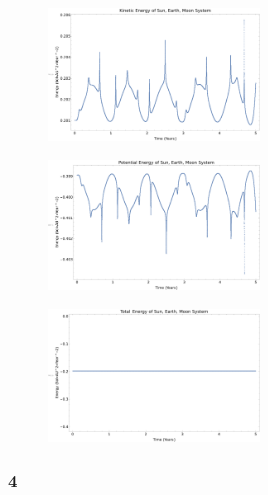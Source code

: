 \documentclass{article}
\begin{document}
\begin{figure}[!htb]
	\begin{center}
		\includegraphics[width=0.5\textwidth]{p1-3d.pdf}
	\end{center}
	\caption{}
\label{fig:qual}
\end{figure}
\FloatBarrier


\begin{figure}[!htb]
	\begin{center}
		\includegraphics[width=0.5\textwidth]{p1-3e.pdf}
	\end{center}
	\caption{}
\label{fig:qual}
\end{figure}
\FloatBarrier


\begin{figure}[!htb]
	\begin{center}
		\includegraphics[width=0.5\textwidth]{p1-3f.pdf}
	\end{center}
	\caption{}
\label{fig:qual}
\end{figure}
\FloatBarrier  

\subsubsection{4}
\end{document}
